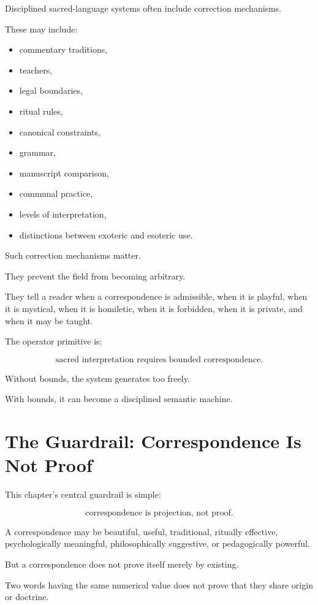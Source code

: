 \documentclass[11pt]{book}
\begin{document}
Disciplined sacred-language systems often include correction mechanisms.

These may include:

\begin{itemize}
    \item commentary traditions,
    \item teachers,
    \item legal boundaries,
    \item ritual rules,
    \item canonical constraints,
    \item grammar,
    \item manuscript comparison,
    \item communal practice,
    \item levels of interpretation,
    \item distinctions between exoteric and esoteric use.
\end{itemize}

Such correction mechanisms matter.

They prevent the field from becoming arbitrary.

They tell a reader when a correspondence is admissible, when it is playful, when it is mystical, when it is homiletic, when it is forbidden, when it is private, and when it may be taught.

The operator primitive is:

\[
\text{sacred interpretation requires bounded correspondence}.
\]

Without bounds, the system generates too freely.

With bounds, it can become a disciplined semantic machine.

\section{The Guardrail: Correspondence Is Not Proof}

This chapter's central guardrail is simple:

\[
\text{correspondence is projection, not proof}.
\]

A correspondence may be beautiful, useful, traditional, ritually effective, psychologically meaningful, philosophically suggestive, or pedagogically powerful.

But a correspondence does not prove itself merely by existing.

Two words having the same numerical value does not prove that they share origin or doctrine.
\end{document}
